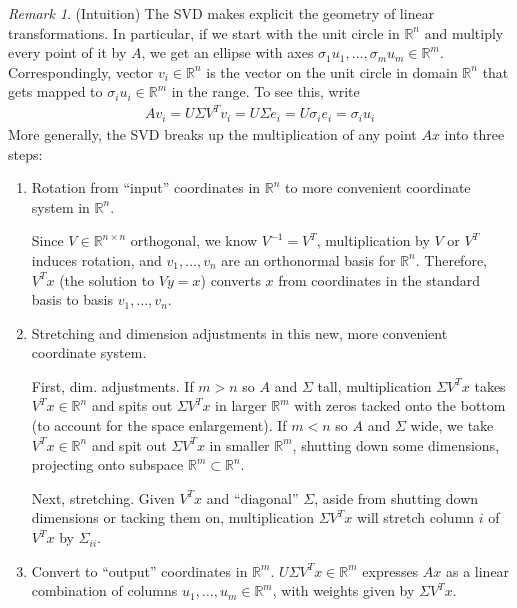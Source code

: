 \documentclass[12pt]{book}
\numberwithin{equation}{section} %
\theoremstyle{plain}
\theoremstyle{definition}
\theoremstyle{remark}
\newtheorem*{rmk}{Remark}
\newcommand{\Rn}{\mathbb{R}^n}
\newcommand{\Rm}{\mathbb{R}^m}
\newcommand{\Rnn}{\mathbb{R}^{n\times n}}
\begin{document}
\begin{rmk}(Intuition)
The SVD makes explicit the geometry of linear transformations. In
particular, if we start with the unit circle in $\Rn$ and multiply every
point of it by $A$, we get an ellipse with axes
$\sigma_1u_1,\ldots,\sigma_mu_m\in\Rm$. Correspondingly, vector
$v_i\in\Rn$ is the vector on the unit circle in domain $\Rn$ that gets
mapped to $\sigma_iu_i\in\Rm$ in the range. To see this, write
\begin{align*}
  Av_i = U\Sigma V^T v_i = U\Sigma e_i
  = U\sigma_i e_i = \sigma_iu_i
\end{align*}
More generally, the SVD breaks up the multiplication of any point $Ax$
into three steps:
\begin{enumerate}
  \item
    Rotation from ``input'' coordinates in $\Rn$ to more
    convenient coordinate system in $\Rn$.

    Since $V\in\Rnn$ orthogonal, we know $V^{-1}=V^T$, multiplication by
    $V$ or $V^T$ induces rotation, and $v_1,\ldots,v_n$ are an
    orthonormal basis for $\Rn$. Therefore, $V^Tx$ (the solution to
    $Vy=x$) converts $x$ from coordinates in the standard basis to basis
    $v_1,\ldots,v_n$.

  \item Stretching and dimension adjustments in this new, more
    convenient coordinate system.

    First, dim. adjustments. If $m>n$ so $A$ and $\Sigma$ tall,
    multiplication $\Sigma V^Tx$ takes $V^Tx\in\Rn$ and spits out
    $\Sigma V^Tx$ in larger $\Rm$ with zeros tacked onto the bottom (to
    account for the space enlargement). If $m<n$ so $A$ and $\Sigma$
    wide, we take $V^Tx\in\Rn$ and spit out $\Sigma V^Tx$ in smaller
    $\Rm$, shutting down some dimensions, projecting onto subspace
    $\Rm\subset\Rn$.

    Next, stretching. Given $V^Tx$ and ``diagonal'' $\Sigma$, aside from
    shutting down dimensions or tacking them on, multiplication $\Sigma
    V^Tx$ will stretch column $i$ of $V^Tx$ by $\Sigma_{ii}$.

  \item Convert to ``output'' coordinates in $\Rm$.
    $U\Sigma V^Tx\in\Rm $ expresses $Ax$ as a linear combination of
    columns $u_1,\ldots,u_m\in\Rm$, with weights given by $\Sigma V^Tx$.
\end{enumerate}
\end{rmk}
\end{document}
